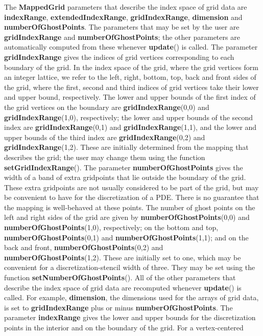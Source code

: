 \documentclass{article}
\begin{document}
The \textbf{MappedGrid} parameters that describe the index space of grid data are \textbf{indexRange},
\textbf{extendedIndexRange}, \textbf{gridIndexRange}, \textbf{dimension} and \textbf{numberOfGhostPoints}.
The parameters that may be set by the user are \textbf{gridIndexRange} and \textbf{numberOfGhostPoints}; the other
parameters are automatically computed from these whenever \textbf{update}() is called.  The parameter
\textbf{gridIndexRange} gives the indices of grid vertices corresponding
to each boundary of the grid.  In the index space of the grid, where the grid vertices form an integer lattice, we refer to the
left, right, bottom, top, back and front sides of the grid, where the first, second and third indices of grid vertices take their
lower and upper bound, respectively.  The lower and upper bounds of the first index of the grid vertices on the boundary are
\textbf{gridIndexRange}(0,0) and \textbf{gridIndexRange}(1,0), respectively; the lower and upper bounds of the second
index are \textbf{gridIndexRange}(0,1) and \textbf{gridIndexRange}(1,1), and the lower and upper bounds of the third
index are \textbf{gridIndexRange}(0,2) and \textbf{gridIndexRange}(1,2).  These are initially determined from the
mapping that describes the grid; the user may change them using the function \textbf{setGridIndexRange}().  The parameter
\textbf{numberOfGhostPoints} gives the width of a band of extra gridpoints that lie outside the boundary of the grid.
These extra gridpoints are not usually considered to be part of the grid, but may be convenient to have for the discretization
of a PDE.  There is no guarantee that the mapping is well-behaved at these points.  The number of ghost points on the
left and right sides of the grid are given by \textbf{numberOfGhostPoints}(0,0) and \textbf{numberOfGhostPoints}(1,0),
respectively; on the bottom and top, \textbf{numberOfGhostPoints}(0,1) and \textbf{numberOfGhostPoints}(1,1); and on
the back and front, \textbf{numberOfGhostPoints}(0,2) and \textbf{numberOfGhostPoints}(1,2).  These are initially set
to one, which may be convenient for a discretization-stencil width of three.  They may be set using the function
\textbf{setNumberOfGhostPoints}().  All of the other parameters that describe the index space of grid data are recomputed
whenever \textbf{update}() is called.  For example, \textbf{dimension}, the dimensions used for the arrays of grid data,
is set to \textbf{gridIndexRange} plus or minus \textbf{numberOfGhostPoints}.  The parameter \textbf{indexRange}
gives the lower and upper bounds for the discretization points in the interior and on the boundary of the grid.  For a vertex-centered
\end{document}

